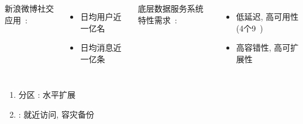 \begin{frame}{}
  \vspace{0.50cm}

  \begin{columns}
	新浪微博社交应用~\footnotemark:
	\begin{itemize}
	  \item 日均用户近一亿名
	  \item 日均消息近一亿条
	\end{itemize}
	\pause
	底层数据服务系统特性需求~: 
	\begin{itemize}
	  \item 低延迟, 高可用性 (4个9~\footnotemark)
	  \item 高容错性, 高可扩展性
	\end{itemize}
  \end{columns}
  
\end{frame}
\begin{frame}{}
  \graphicspath{{tikz/}}
  \begin{figure}[h!]
    \centering
    \begin{adjustbox}{max totalsize = {0.50\textwidth}{1.00\textheight}, center}
      
    \end{adjustbox}
  \end{figure}

  \vspace{0.20cm}
  \begin{center}
    \begin{minipage}{0.65\textwidth}

      \vspace{0.20cm}
      \begin{enumerate}
	\item<2-> 分区 : 水平扩展
	\item<3-> : 就近访问, 容灾备份
      \end{enumerate}
    \end{minipage}
  \end{center}
\end{frame}


